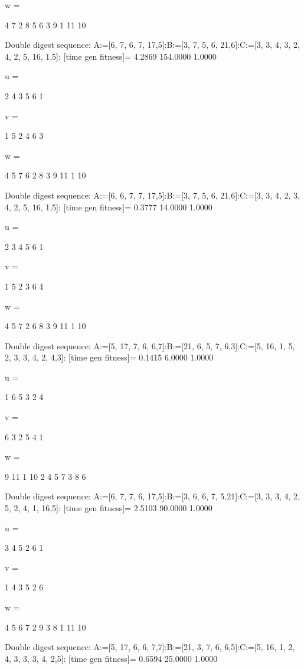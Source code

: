 w =

     4     7     2     8     5     6     3     9     1    11    10

Double digest sequence:
A:=[6, 7, 6, 7, 17,5]:B:=[3, 7, 5, 6, 21,6]:C:=[3, 3, 4, 3, 2, 4, 2, 5, 16, 1,5]:
[time gen fitness]=
    4.2869  154.0000    1.0000


u =

     2     4     3     5     6     1


v =

     1     5     2     4     6     3


w =

     4     5     7     6     2     8     3     9    11     1    10

Double digest sequence:
A:=[6, 6, 7, 7, 17,5]:B:=[3, 7, 5, 6, 21,6]:C:=[3, 3, 4, 2, 3, 4, 2, 5, 16, 1,5]:
[time gen fitness]=
    0.3777   14.0000    1.0000


u =

     2     3     4     5     6     1


v =

     1     5     2     3     6     4


w =

     4     5     7     2     6     8     3     9    11     1    10

Double digest sequence:
A:=[5, 17, 7, 6, 6,7]:B:=[21, 6, 5, 7, 6,3]:C:=[5, 16, 1, 5, 2, 3, 3, 4, 2, 4,3]:
[time gen fitness]=
    0.1415    6.0000    1.0000


u =

     1     6     5     3     2     4


v =

     6     3     2     5     4     1


w =

     9    11     1    10     2     4     5     7     3     8     6

Double digest sequence:
A:=[6, 7, 7, 6, 17,5]:B:=[3, 6, 6, 7, 5,21]:C:=[3, 3, 3, 4, 2, 5, 2, 4, 1, 16,5]:
[time gen fitness]=
    2.5103   90.0000    1.0000


u =

     3     4     5     2     6     1


v =

     1     4     3     5     2     6


w =

     4     5     6     7     2     9     3     8     1    11    10

Double digest sequence:
A:=[5, 17, 6, 6, 7,7]:B:=[21, 3, 7, 6, 6,5]:C:=[5, 16, 1, 2, 4, 3, 3, 3, 4, 2,5]:
[time gen fitness]=
    0.6594   25.0000    1.0000


